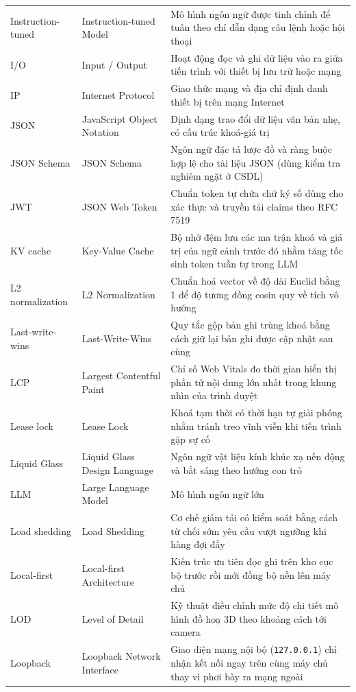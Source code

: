{\begin{longtable}{@{}>{\raggedright\arraybackslash}p{3.4cm}>{\raggedright\arraybackslash}p{4.7cm}>{\raggedright\arraybackslash}p{7.15cm}@{}}
    Instruction-tuned & Instruction-tuned Model & Mô hình ngôn ngữ được tinh chỉnh để tuân theo chỉ dẫn dạng câu lệnh hoặc hội thoại \\
    I/O & Input / Output & Hoạt động đọc và ghi dữ liệu vào ra giữa tiến trình với thiết bị lưu trữ hoặc mạng \\
    IP & Internet Protocol & Giao thức mạng và địa chỉ định danh thiết bị trên mạng Internet \\
    JSON & JavaScript Object Notation & Định dạng trao đổi dữ liệu văn bản nhẹ, có cấu trúc khoá-giá trị \\
    JSON Schema & JSON Schema & Ngôn ngữ đặc tả lược đồ và ràng buộc hợp lệ cho tài liệu JSON (dùng kiểm tra nghiêm ngặt ở CSDL) \\
    JWT & JSON Web Token & Chuẩn token tự chứa chữ ký số dùng cho xác thực và truyền tải claims theo RFC 7519 \\
    KV cache & Key-Value Cache & Bộ nhớ đệm lưu các ma trận khoá và giá trị của ngữ cảnh trước đó nhằm tăng tốc sinh token tuần tự trong LLM \\
    L2 normalization & L2 Normalization & Chuẩn hoá vector về độ dài Euclid bằng 1 để độ tương đồng cosin quy về tích vô hướng \\
    Last-write-wins & Last-Write-Wins & Quy tắc gộp bản ghi trùng khoá bằng cách giữ lại bản ghi được cập nhật sau cùng \\
    LCP & Largest Contentful Paint & Chỉ số Web Vitals đo thời gian hiển thị phần tử nội dung lớn nhất trong khung nhìn của trình duyệt \\
    Lease lock & Lease Lock & Khoá tạm thời có thời hạn tự giải phóng nhằm tránh treo vĩnh viễn khi tiến trình gặp sự cố \\
    Liquid Glass & Liquid Glass Design Language & Ngôn ngữ vật liệu kính khúc xạ nền động và bắt sáng theo hướng con trỏ \\
    LLM & Large Language Model & Mô hình ngôn ngữ lớn \\
    Load shedding & Load Shedding & Cơ chế giảm tải có kiểm soát bằng cách từ chối sớm yêu cầu vượt ngưỡng khi hàng đợi đầy \\
    Local-first & Local-first Architecture & Kiến trúc ưu tiên đọc ghi trên kho cục bộ trước rồi mới đồng bộ nền lên máy chủ \\
    LOD & Level of Detail & Kỹ thuật điều chỉnh mức độ chi tiết mô hình đồ hoạ 3D theo khoảng cách tới camera \\
    Loopback & Loopback Network Interface & Giao diện mạng nội bộ (\texttt{127.0.0.1}) chỉ nhận kết nối ngay trên cùng máy chủ thay vì phơi bày ra mạng ngoài \\

\end{longtable}}
